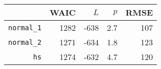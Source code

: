 \begin{tabular}{rrrrr}
  \hline
 & WAIC & $L$ & $p$ & RMSE \\ 
  \hline
\texttt{normal\_1} & 1282 & -638 & 2.7 & 107 \\ 
  \texttt{normal\_2} & 1271 & -634 & 1.8 & 123 \\ 
  \texttt{hs} & 1274 & -632 & 4.7 & 120 \\ 
   \hline
\end{tabular}
